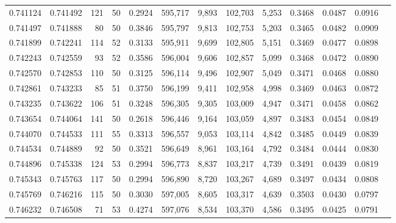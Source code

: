 \begin{tabular}{rrrrrrrrrrrrr}
0.741124 & 0.741492 &   121 &  50 &                                     0.2924 & 595,717 &   9,893 & 102,703 &   5,253 & 0.3468 & 0.0487 & 0.0916 \\
0.741497 & 0.741888 &    80 &  50 &                                     0.3846 & 595,797 &   9,813 & 102,753 &   5,203 & 0.3465 & 0.0482 & 0.0909 \\
0.741899 & 0.742241 &   114 &  52 &                                     0.3133 & 595,911 &   9,699 & 102,805 &   5,151 & 0.3469 & 0.0477 & 0.0898 \\
0.742243 & 0.742559 &    93 &  52 &                                     0.3586 & 596,004 &   9,606 & 102,857 &   5,099 & 0.3468 & 0.0472 & 0.0890 \\
0.742570 & 0.742853 &   110 &  50 &                                     0.3125 & 596,114 &   9,496 & 102,907 &   5,049 & 0.3471 & 0.0468 & 0.0880 \\
0.742861 & 0.743233 &    85 &  51 &                                     0.3750 & 596,199 &   9,411 & 102,958 &   4,998 & 0.3469 & 0.0463 & 0.0872 \\
0.743235 & 0.743622 &   106 &  51 &                                     0.3248 & 596,305 &   9,305 & 103,009 &   4,947 & 0.3471 & 0.0458 & 0.0862 \\
0.743654 & 0.744064 &   141 &  50 &                                     0.2618 & 596,446 &   9,164 & 103,059 &   4,897 & 0.3483 & 0.0454 & 0.0849 \\
0.744070 & 0.744533 &   111 &  55 &                                     0.3313 & 596,557 &   9,053 & 103,114 &   4,842 & 0.3485 & 0.0449 & 0.0839 \\
0.744534 & 0.744889 &    92 &  50 &                                     0.3521 & 596,649 &   8,961 & 103,164 &   4,792 & 0.3484 & 0.0444 & 0.0830 \\
0.744896 & 0.745338 &   124 &  53 &                                     0.2994 & 596,773 &   8,837 & 103,217 &   4,739 & 0.3491 & 0.0439 & 0.0819 \\
0.745343 & 0.745763 &   117 &  50 &                                     0.2994 & 596,890 &   8,720 & 103,267 &   4,689 & 0.3497 & 0.0434 & 0.0808 \\
0.745769 & 0.746216 &   115 &  50 &                                     0.3030 & 597,005 &   8,605 & 103,317 &   4,639 & 0.3503 & 0.0430 & 0.0797 \\
0.746232 & 0.746508 &    71 &  53 &                                     0.4274 & 597,076 &   8,534 & 103,370 &   4,586 & 0.3495 & 0.0425 & 0.0791 \\

\end{tabular}
